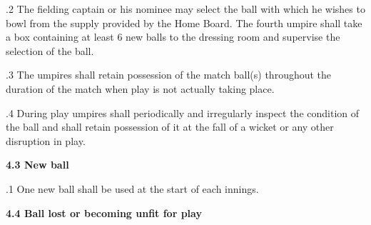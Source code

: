 \documentclass[12pt]{article}
\begin{document}
\vspace{\baselineskip}
\begin{adjustwidth}{0.5in}{0.4in}
{\fontsize{9pt}{10.8pt}.2 \tabto{0.49in} The fielding captain or his nominee may select the ball with which he wishes to bowl from the supply provided by the Home Board. The fourth umpire shall take a box containing at least 6 new balls to the dressing room and supervise the selection of the ball.\par}\par

\end{adjustwidth}


\vspace{\baselineskip}
\begin{adjustwidth}{0.5in}{0.14in}
{\fontsize{9pt}{10.8pt}.3 \tabto{0.49in} The umpires shall retain possession of the match ball(s) throughout the duration of the match when play is not actually taking place.\par}\par

\end{adjustwidth}


\vspace{\baselineskip}
\begin{adjustwidth}{0.5in}{0.47in}
{\fontsize{9pt}{10.8pt}.4 \tabto{0.49in} During play umpires shall periodically and irregularly inspect the condition of the ball and shall retain possession of it at the fall of a wicket or any other disruption in play.\par}\par

\end{adjustwidth}


\vspace{\baselineskip}
{\fontsize{11pt}{13.2pt}\selectfont \textbf{4.3 \tabto{0.47in} New ball}\par}\par


\vspace{\baselineskip}
{\fontsize{9pt}{10.8pt}.1 \tabto{0.49in} One new ball shall be used at the start of each innings.\par}\par


\vspace{\baselineskip}
{\fontsize{11pt}{13.2pt}\selectfont \textbf{4.4 \tabto{0.47in} Ball lost or becoming unfit for play}\par}\par
\end{document}
